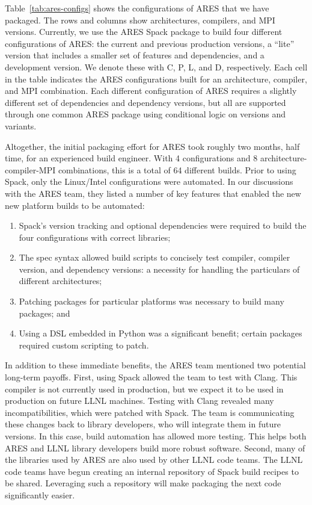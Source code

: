 Table~\ref{tab:ares-configs} shows the configurations of ARES that we have packaged.
The rows and columns show architectures, compilers, and MPI versions.
Currently, we use the ARES Spack package to build four different configurations
of ARES: the current and previous production versions, a ``lite'' version that includes
a smaller set of features and dependencies, and a development version.  We denote these
with C, P, L, and D, respectively.  Each cell in the table indicates the 
ARES configurations built for an architecture, compiler, and MPI combination.
Each different configuration of ARES requires a slightly different set of
dependencies and dependency versions, but all are supported through one common
ARES package using conditional logic on versions and variants.

Altogether, the initial packaging effort for ARES took roughly two months,
half time, for an experienced build engineer.  With 4 configurations and 8 
architecture-compiler-MPI combinations, this is a total of 64 different builds.
Prior to using Spack, only the Linux/Intel configurations were automated.
In our discussions with the ARES team, they listed a number of key features
that enabled the new new platform builds to be automated:
\begin{enumerate}
\item Spack's version tracking and optional dependencies were required to
      build the four configurations with correct libraries;
\item The spec syntax allowed build scripts to concisely test compiler, 
      compiler version, and dependency versions: a necessity
      for handling the particulars of different architectures;
\item Patching packages for particular platforms was
      necessary to build many packages; and 
\item Using a DSL embedded in Python was a significant benefit;
      certain packages required custom scripting to patch.
\end{enumerate}

In addition to these immediate benefits, the ARES team mentioned
two potential long-term payoffs. First, using Spack allowed
the team to test with Clang.  This compiler is not currently used in
production, but we expect it to be used in production on future LLNL machines.
Testing with Clang revealed many incompatibilities, which were patched with
Spack. The team is communicating these changes back to library developers,
who will integrate them in future versions.  In this case, build automation
has allowed more testing. This helps both ARES and LLNL library developers
build more robust software.
%
Second, many of the libraries used by ARES are also used by other LLNL code
teams.  The LLNL code teams have begun creating an internal repository of
Spack build recipes to be shared.  Leveraging such a repository will
make packaging the next code significantly easier.


















